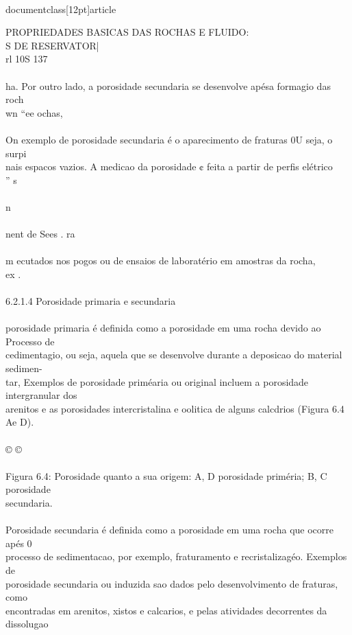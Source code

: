 \\documentclass[12pt]{article}
\begin{document}
PROPRIEDADES BASICAS DAS ROCHAS E FLUIDO:\\
S DE RESERVATOR|\\
rl 10S 137\\
\\
ha. Por outro lado, a porosidade secundaria se desenvolve apésa formagio das roch\\
wn “ee ochas,\\
\\
On exemplo de porosidade secundaria é o aparecimento de fraturas 0U seja, o surpi\\
nais espacos vazios. A medicao da porosidade ¢ feita a partir de perfis elétrico\\
” s\\
\\
n\\
\\
nent de Sees . ra\\
\\
m ecutados nos pogos ou de ensaios de laboratério em amostras da rocha,\\
ex .\\
\\
6.2.1.4 Porosidade primaria e secundaria\\
\\
porosidade primaria é definida como a porosidade em uma rocha devido ao Processo de\\
cedimentagio, ou seja, aquela que se desenvolve durante a deposicao do material sedimen-\\
tar, Exemplos de porosidade priméaria ou original incluem a porosidade intergranular dos\\
arenitos e as porosidades intercristalina e oolitica de alguns calcdrios (Figura 6.4 Ae D).\\
\\
© ©\\
\\
Figura 6.4: Porosidade quanto a sua origem: A, D porosidade priméria; B, C porosidade\\
secundaria.\\
\\
Porosidade secundaria é definida como a porosidade em uma rocha que ocorre apés 0\\
processo de sedimentacao, por exemplo, fraturamento e recristalizagéo. Exemplos de\\
porosidade secundaria ou induzida sao dados pelo desenvolvimento de fraturas, como\\
encontradas em arenitos, xistos e calcarios, e pelas atividades decorrentes da dissolugao\\
\end{document}
